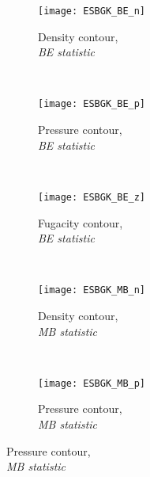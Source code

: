 \documentclass{rsproca}%
\begin{document}
\begin{figure}
        \centering
        \begin{subfigure}[b]{0.32\textwidth}
                \centering
                \texttt{[image: ESBGK\_BE\_n]}
                \caption{Density contour, \\ \it{BE statistic}}
                \label{fig:5ESBGK_BE_n}
        \end{subfigure}%
        ~ %
				\begin{subfigure}[b]{0.32\textwidth}
                \centering
                \texttt{[image: ESBGK\_BE\_p]}
                \caption{Pressure contour, \\ \it{BE statistic}}
                \label{fig:5ESBGK_BE_p}
        \end{subfigure}
        ~ %
        \begin{subfigure}[b]{0.32\textwidth}
                \centering
                \texttt{[image: ESBGK\_BE\_z]}
                \caption{Fugacity contour, \\ \it{BE statistic}}
                \label{fig:5ESBGK_BE_z}
        \end{subfigure}
				~ %
        \begin{subfigure}[b]{0.32\textwidth}
                \centering
                \texttt{[image: ESBGK\_MB\_n]}
                \caption{Density contour, \\ \it{MB statistic}}
                \label{fig:5ESBGK_MB_n}
        \end{subfigure}
        ~ %
        \begin{subfigure}[b]{0.32\textwidth}
                \centering
                \texttt{[image: ESBGK\_MB\_p]}
                \caption{Pressure contour, \\ \it{MB statistic}}

\end{subfigure}
\end{figure}
\end{document}
